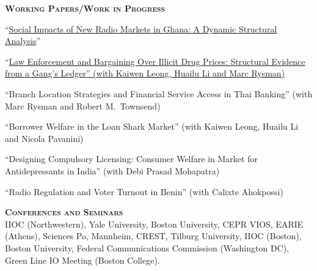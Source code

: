 \documentclass[11pt,overlapped,line,letterpaper]{article}
\newcommand{\cvsec}[1]{\vspace{\baselineskip}\textbf{\textsc{#1}}}
\newenvironment{list1}{
  \begin{list}{\ding{113}}{%
      \setlength{\itemsep}{0in}\setlength{\itemindent}{-1.5em}
      \setlength{\parsep}{0in}\setlength{\parskip}{0in}
      \setlength{\topsep}{0in}\setlength{\partopsep}{0in}
      \setlength{\leftmargin}{0.5in}}}{\end{list}}
\begin{document}
\cvsec{Working Papers/Work in Progress}
\begin{list1}
  \item[] ``\href{https://walshc.github.io/research/ghana_radio.pdf}{Social Impacts of New Radio Markets in Ghana: A Dynamic Structural Analysis}''
  \item[] ``\href{https://walshc.github.io/research/gang_bargaining.pdf}{Law Enforcement and Bargaining Over Illicit Drug Prices: Structural Evidence from a Gang's Ledger'' (with Kaiwen Leong, Huailu Li and Marc Rysman)}
  \item[] ``Branch Location Strategies and Financial Service Access in Thai Banking'' (with Marc Rysman and Robert M.~Townsend)
  \item[] ``Borrower Welfare in the Loan Shark Market'' (with Kaiwen Leong, Huailu Li and Nicola Pavanini)
  \item[] ``Designing Compulsory Licensing: Consumer Welfare in Market for Antidepressants in India'' (with Debi Prasad Mohapatra)
  \item[] ``Radio Regulation and Voter Turnout in Benin'' (with Calixte Ahokpossi)
\end{list1}

\cvsec{Conferences and Seminars} \smallskip\\
IIOC (Northwestern), Yale University, Boston University,
CEPR VIOS,
EARIE (Athens), Sciences Po, Mannheim, CREST, Tilburg University,
IIOC (Boston), Boston University, Federal Communications Commission (Washington DC), Green Line IO Meeting (Boston College).

\end{document}
